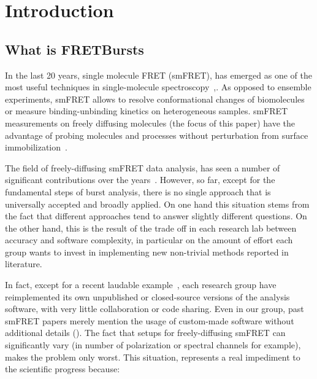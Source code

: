 \section{Introduction}

\subsection{What is FRETBursts}

In the last 20 years, single molecule FRET (smFRET), has emerged as one of the most
useful techniques in single-molecule spectroscopy~\cite{Weiss_1999},\cite{Hohlbein_2014}. 
As opposed to ensemble experiments, smFRET allows to resolve conformational 
changes of biomolecules or measure binding-unbinding kinetics on heterogeneous samples. 
smFRET measurements on freely diffusing molecules (the focus of this paper) have the advantage 
of probing molecules and processes without perturbation from surface immobilization~\cite{Dahan_1999}\cite{Eggeling_1998}. 

The field of freely-diffusing smFRET data analysis, has seen a number of significant 
contributions over the years~\cite{Fries_1998}\cite{Eggeling_2001}\cite{Zhang_2005}\cite{Gopich_2005}\cite{Lee_2005}\cite{Nir_2006}\cite{Antonik2006}\cite{Gopich_2007}\cite{Gopich_2008}\cite{Camley_2009}\cite{Santoso_2010}\cite{Torella_2011}\cite{Tomov_2012}. However, so far, except for the fundamental steps of burst analysis, 
there is no single approach that is universally accepted and broadly applied. 
On one hand this situation stems from the fact that
different approaches tend to answer slightly different questions.
On the other hand, this is the result of the trade off in each research lab
between accuracy and software complexity, in particular on the amount of effort
each group wants to invest in implementing new non-trivial methods reported in literature.

In fact, except for a recent laudable example~\cite{Murphy2014}, 
each research group have reimplemented its own unpublished or closed-source versions
of the analysis software, with very little collaboration or code sharing.
Even in our group, past smFRET papers merely mention the usage of custom-made software without 
additional details (\cite{Lee_2005}\cite{Nir_2006}).
The fact that setups for freely-diffusing smFRET can significantly 
vary (in number of polarization or spectral channels for example), 
makes the problem only worst.
This situation, represents a real impediment to the scientific progress because:

